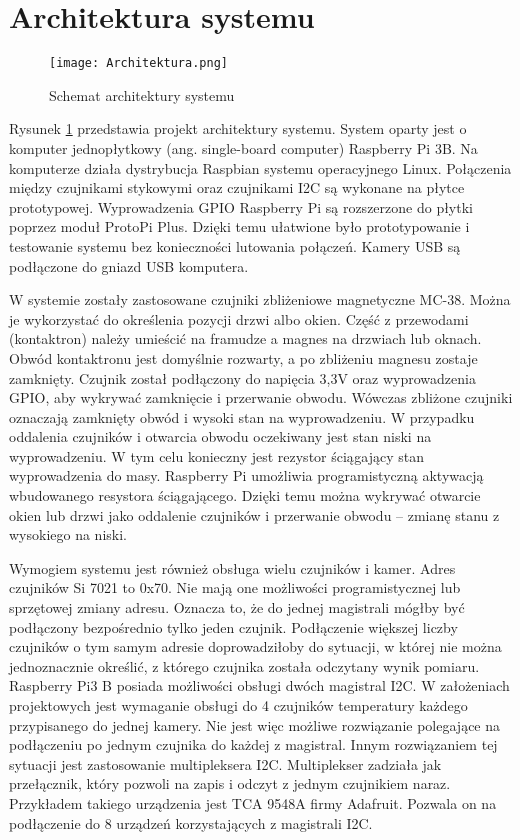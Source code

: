 \documentclass[a4paper,12pt,twoside]{article}
\begin{document}
\section{Architektura systemu}

\begin{figure}[h]
\texttt{[image: Architektura.png]}
\caption{Schemat architektury systemu}
\label{fig: architektura}
\end{figure}

Rysunek \ref{fig: architektura} przedstawia projekt architektury systemu. System oparty jest o komputer jednopłytkowy (ang. single-board computer) Raspberry Pi 3B. Na komputerze działa dystrybucja Raspbian systemu operacyjnego Linux. Połączenia między czujnikami stykowymi oraz czujnikami I2C są wykonane na płytce prototypowej. Wyprowadzenia GPIO Raspberry Pi są rozszerzone do płytki poprzez moduł ProtoPi Plus. Dzięki temu ułatwione było prototypowanie i testowanie systemu bez konieczności lutowania połączeń. Kamery USB są podłączone do gniazd USB komputera.

W systemie zostały zastosowane czujniki zbliżeniowe magnetyczne MC-38. Można je wykorzystać do określenia pozycji drzwi albo okien. Część z przewodami (kontaktron) należy umieścić na framudze a magnes na drzwiach lub oknach. Obwód kontaktronu jest domyślnie rozwarty, a po zbliżeniu magnesu zostaje zamknięty. Czujnik został podłączony do napięcia 3,3V oraz wyprowadzenia GPIO, aby wykrywać zamknięcie i przerwanie obwodu. Wówczas zbliżone czujniki oznaczają zamknięty obwód i wysoki stan na wyprowadzeniu. W przypadku oddalenia czujników i otwarcia obwodu oczekiwany jest stan niski na wyprowadzeniu. W tym celu konieczny jest rezystor ściągający stan wyprowadzenia do masy. Raspberry Pi umożliwia programistyczną aktywacją wbudowanego resystora ściągającego. Dzięki temu można wykrywać otwarcie okien lub drzwi jako oddalenie czujników i przerwanie obwodu -- zmianę stanu z wysokiego na niski.

Wymogiem systemu jest również obsługa wielu czujników i kamer. Adres czujników Si 7021 to 0x70. Nie mają one możliwości programistycznej lub sprzętowej zmiany adresu. Oznacza to, że do jednej magistrali mógłby być podłączony bezpośrednio tylko jeden czujnik. Podłączenie większej liczby czujników o tym samym adresie doprowadziłoby do sytuacji, w której nie można jednoznacznie określić, z którego czujnika została odczytany wynik pomiaru. Raspberry Pi3 B posiada możliwości obsługi dwóch magistral I2C. W założeniach projektowych jest wymaganie obsługi do 4 czujników temperatury każdego przypisanego do jednej kamery. Nie jest więc możliwe rozwiązanie polegające na podłączeniu po jednym czujnika do każdej z magistral. Innym rozwiązaniem tej sytuacji jest zastosowanie multipleksera I2C. Multiplekser zadziała jak przełącznik, który pozwoli na zapis i odczyt z jednym czujnikiem naraz. Przykładem takiego urządzenia jest TCA 9548A firmy Adafruit. Pozwala on na podłączenie do 8 urządzeń korzystających z magistrali I2C.
\end{document}

